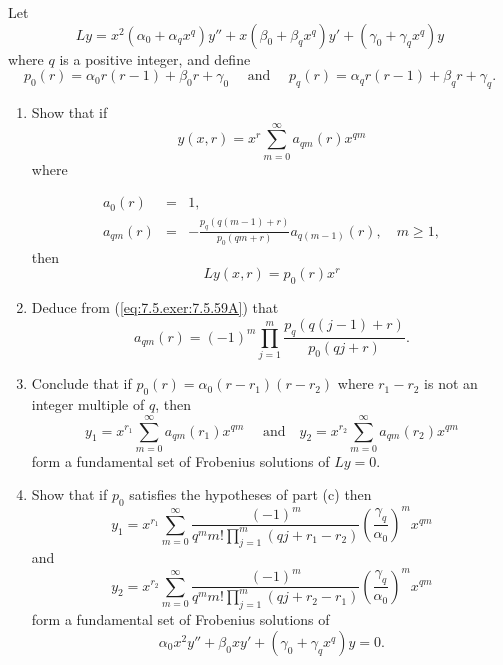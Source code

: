 \documentclass{ximera}
\begin{document}
\begin{problem}\label{exer:7.5.59}
Let
$$
Ly=x^2(\alpha_0+\alpha_qx^q)y''+x(\beta_0+\beta_qx^q)y'+
(\gamma_0+\gamma_qx^q)y
$$
where $q$ is a positive integer, and  define
$$
p_0(r)=\alpha_0r(r-1)+\beta_0r+\gamma_0\quad\mbox{ and }\quad
p_q(r)=\alpha_qr(r-1)+\beta_qr+\gamma_q.
$$
\begin{enumerate}
\item %
Show that if
$$
y(x,r)=x^{r}\sum_{m=0}^\infty a_{qm}(r)x^{qm}
$$
where

\begin{equation} \label{eq:7.5.exer:7.5.59A}
\begin{array}{rcl}
a_0(r)&=&1,\\
a_{qm}(r)&=&-\frac{p_q\left(q(m-1)+r\right)}{p_0(qm+r)}a_{q(m-1)}(r),\quad m\geq 1,
\end{array}
\end{equation}
then
$$
Ly(x,r)=p_0(r)x^r
$$
\item %
Deduce from (\ref{eq:7.5.exer:7.5.59A}) that
$$
a_{qm}(r)=(-1)^m\prod_{j=1}^m\frac{p_q\left(q(j-1)+r\right)}{ p_0(qj+r)}.
$$
\item %
Conclude that if $p_0(r)=\alpha_0(r-r_1)(r-r_2)$ where $r_1-r_2$
is not an integer multiple of $q$, then
$$
y_1=x^{r_1}\sum_{m=0}^\infty a_{qm}(r_1)x^{qm}\quad\mbox{ and
}\quad y_2=x^{r_2}\sum_{m=0}^\infty a_{qm}(r_2)x^{qm}
$$
form a fundamental set of Frobenius solutions of $Ly=0$.
\item %
Show that if $p_0$ satisfies the hypotheses of part (c) then
$$
y_1=x^{r_1}\sum_{m=0}^\infty \frac{(-1)^m}{
q^mm!\prod_{j=1}^m(qj+r_1-r_2)}
\left(\frac{\gamma_q}{\alpha_0}\right)^mx^{qm}
$$
and
$$
y_2=x^{r_2}\sum_{m=0}^\infty \frac{(-1)^m}{
q^mm!\prod_{j=1}^m(qj+r_2-r_1)}
\left(\frac{\gamma_q}{\alpha_0}\right)^mx^{qm}
$$
form a fundamental set of Frobenius solutions of
$$
\alpha_0x^2y''+\beta_0xy'+(\gamma_0+\gamma_qx^q)y=0.
$$
\end{enumerate}
\end{problem}
\end{document}
